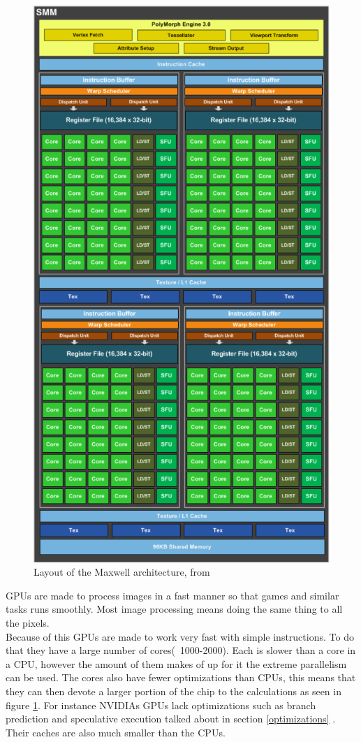\documentclass[10pt,a4paper]{report}
\begin{document}
\begin{figure}[h]
    \centering
    \includegraphics[width=12cm]{gpu_scheme.png}
    \caption{Layout of the Maxwell architecture, from \cite{nvidia_maxwell}}
    \label{fig:gpu_scheme}
\end{figure}

GPUs are made to process images in a fast manner so that games and similar tasks runs smoothly. Most image processing means doing the same thing to all the pixels. 
\\
Because of this GPUs are made to work very fast with simple instructions\cite{cuda}. To do that they have a large number of cores(~1000-2000)\cite{nvtesla}. Each is slower than a core in a CPU, however the amount of them makes of up for it the extreme parallelism can be used. The cores also have fewer optimizations than CPUs, this means that they can then devote a larger portion of the chip to the calculations as seen in figure \ref{fig:gpu_scheme}. For instance NVIDIAs GPUs lack optimizations such as branch prediction and speculative execution talked about in section \ref{optimizations} \cite{cuda}. Their caches are also much smaller than the CPUs\cite{cuda}.
\end{document}
